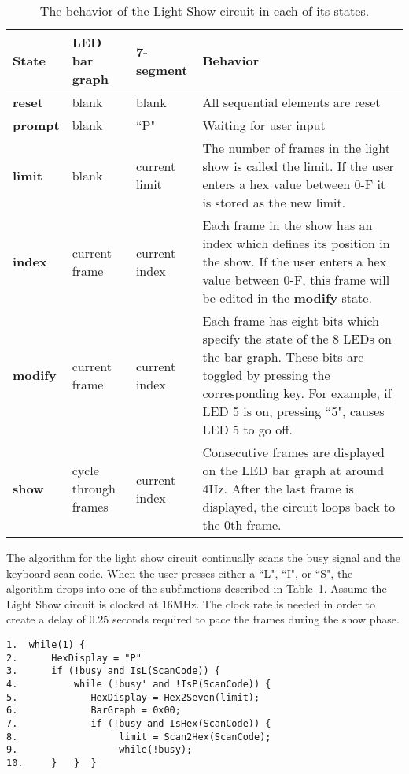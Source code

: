 \begin{description}
\begin{table}
\begin{tabular}{l|p{0.5in}|p{0.5in}|p{2.0in}}
\textbf{ State }	& LED bar graph	& 7-segment	& Behavior 				\\ \hline \hline
\textbf{ reset }	& blank		& blank		& All sequential elements are reset 	\\ \hline
\textbf{ prompt }	& blank		& ``P"		& Waiting for user input		\\ \hline
\textbf{ limit }	& blank		& current limit	& The number of frames in the light show is called 
	the limit. If the user enters a hex value between 0-F it is stored as the new limit. \\  \hline
\textbf{ index }	& current frame	& current index	& Each frame in the show has an index which defines 
	its position in the show. If the user enters a hex value between 0-F, this frame will 
	be edited in the \textbf{ modify } state. 						\\ \hline
\textbf{ modify }	& current frame	& current index	& Each frame has eight bits which specify the state of 
	the 8 LEDs on the bar graph.  These bits are toggled by pressing the corresponding 
	key. For example, if LED 5 is on, pressing ``5", causes LED 5 
	to go off.								\\ \hline
\textbf{ show }	& cycle through frames & current index & Consecutive frames are displayed on the 
	LED bar graph at around 4Hz. After the last frame is displayed, the circuit loops 
	back to the 0th frame. 							\\ 
\end{tabular}
\caption{The behavior of the Light Show circuit in each of its states.}
\label{table:LSbehavior}
\end{table}

The algorithm for the light show circuit continually scans the busy signal 
and the keyboard scan code.  When the user presses either a ``L", 
``I", or ``S", 
the algorithm drops into one of the subfunctions described in 
Table~\ref{table:LSbehavior}.  Assume the Light Show circuit is
clocked at 16MHz.  The clock rate is needed in order to create a delay of
0.25 seconds required to pace the frames during the show phase.  

\pagebreak
\begin{verbatim}
1.  while(1) {
2.      HexDisplay = "P"
3.      if (!busy and IsL(ScanCode)) {
4.          while (!busy' and !IsP(ScanCode)) {
5.             HexDisplay = Hex2Seven(limit);
6.             BarGraph = 0x00;
7.             if (!busy and IsHex(ScanCode)) {
8.                  limit = Scan2Hex(ScanCode);
9.                  while(!busy);
10.     }   }  }


\end{verbatim}
\end{description}
